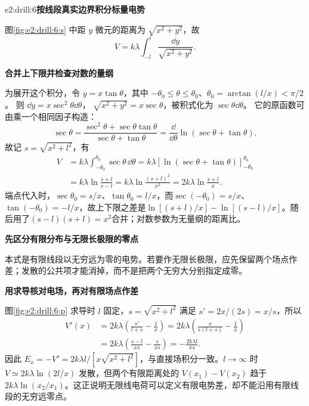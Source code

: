 \begin{drillsolution}{e2:drill:6}\textbf{按线段真实边界积分标量电势}\par\nobreak
图\ref{fig:e2:drill:6:s} 中距 $y$ 微元的距离为 $\sqrt{x^2+y^2}$，故
\[
 V=k\lambda\int_{-l}^l\frac{\dd y}{\sqrt{x^2+y^2}}.
\]


\par\medskip{}\noindent\textbf{合并上下限并检查对数的量纲}\par\nobreak
为展开这个积分，令 $y=x\tan\theta$，其中
$-\theta_0\le\theta\le\theta_0$、$\theta_0=\arctan(l/x)<\pi/2$。
则 $\dd y=x\sec^2\theta\dd\theta$，
$\sqrt{x^2+y^2}=x\sec\theta$，被积式化为 $\sec\theta\dd\theta$。
它的原函数可由乘一个相同因子构造：
\[
 \sec\theta
 =\frac{\sec^2\theta+\sec\theta\tan\theta}{\sec\theta+\tan\theta}
 =\frac{\dd}{\dd\theta}\ln(\sec\theta+\tan\theta).
\]
故记 $s=\sqrt{x^2+l^2}$，有
\begin{align*}
 V&=k\lambda\int_{-\theta_0}^{\theta_0}\sec\theta\,\dd\theta
 =k\lambda[\ln(\sec\theta+\tan\theta)]_{-\theta_0}^{\theta_0}\\
 &=k\lambda\ln\frac{s+l}{s-l}
 =k\lambda\ln\frac{(s+l)^2}{x^2}
 =2k\lambda\ln\frac{s+l}{x}.
\end{align*}
端点代入时，$\sec\theta_0=s/x$、$\tan\theta_0=l/x$，而$\sec(-\theta_0)=s/x$、$\tan(-\theta_0)=-l/x$，故上下限之差是$\ln[(s+l)/x]-\ln[(s-l)/x]$。随后用了$(s-l)(s+l)=x^2$合并；对数参数为无量纲的距离比。



\par\medskip{}\noindent\textbf{先区分有限分布与无限长极限的零点}\par\nobreak
本式是有限线段以无穷远为零的电势。若要作无限长极限，应先保留两个场点作差；发散的公共项才能消掉，而不是把两个无穷大分别指定成零。





\par\medskip{}\noindent\textbf{用求导核对电场，再对有限场点作差}\par\nobreak
图\ref{fig:e2:drill:6:p} 求导时 $l$ 固定，$s=\sqrt{x^2+l^2}$ 满足
$s'=2x/(2s)=x/s$，所以
\begin{align*}
 V'(x)&=2k\lambda\left(\frac{s'}{l+s}-\frac1x\right)
 =2k\lambda\left(\frac{x}{s(l+s)}-\frac1x\right)\\
 &=2k\lambda\left(\frac{s-l}{xs}-\frac{s}{xs}\right)
 =-\frac{2k\lambda l}{xs}.
\end{align*}
因此 $E_x=-V'=2k\lambda l/[x\sqrt{x^2+l^2}]$，与直接场积分一致。$l\to\infty$ 时 $V\simeq2k\lambda\ln(2l/x)$ 发散，但两个有限距离处的 $V(x_1)-V(x_2)$ 趋于 $2k\lambda\ln(x_2/x_1)$。这正说明无限线电荷可以定义有限电势差，却不能沿用有限线段的无穷远零点。\end{drillsolution}
